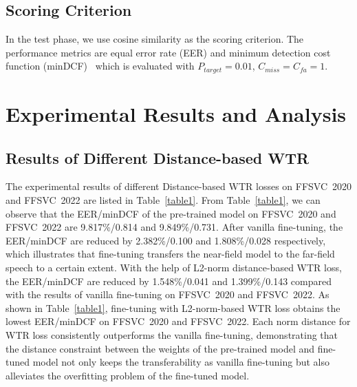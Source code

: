 \documentclass{article}
\begin{document}
\subsection{ Scoring Criterion}
In the test phase, we use cosine similarity as the scoring criterion. The performance metrics are equal error rate (EER)
and minimum detection cost function (minDCF)~\cite{reynolds20172016} which is
evaluated with $P_{target} = 0.01$, $C_{miss} = C_{fa} = 1$.
\section{Experimental Results and Analysis}
\subsection{Results of Different Distance-based WTR}
The experimental results of different Distance-based WTR losses on FFSVC~2020 and FFSVC~2022 are listed in Table~\ref{table1}. From Table~\ref{table1}, we can observe that the EER/minDCF of the pre-trained model on FFSVC~2020 and FFSVC~2022 are 9.817\%/0.814 and 9.849\%/0.731. After vanilla fine-tuning, the EER/minDCF are reduced by 2.382\%/0.100 and 1.808\%/0.028 respectively, which illustrates that fine-tuning transfers the near-field model to the far-field speech to a certain extent. With the help of L2-norm distance-based WTR loss, the EER/minDCF are reduced by 1.548\%/0.041 and 1.399\%/0.143 compared with the results of vanilla fine-tuning on FFSVC~2020 and FFSVC~2022. As shown in Table~\ref{table1}, fine-tuning with L2-norm-based WTR loss obtains the lowest EER/minDCF on FFSVC~2020 and FFSVC~2022.
Each norm distance for WTR loss consistently outperforms the vanilla fine-tuning, demonstrating that the distance constraint between the weights of the pre-trained model and fine-tuned model not only keeps the transferability as vanilla fine-tuning but also alleviates the overfitting problem of the fine-tuned model.
\end{document}

